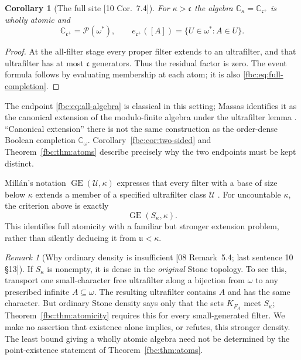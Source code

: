 \documentclass[11pt,letterpaper]{article}
\newtheorem{corollary}[theorem]{Corollary}
\theoremstyle{definition}
\theoremstyle{remark}
\newtheorem{remark}[theorem]{Remark}
\newcommand{\om}{\omega}
\newcommand{\C}{\mathbb C}
\newcommand{\pow}{\mathcal P}
\newcommand{\cu}{\mathfrak u}
\newcommand{\cc}{\mathfrak c}
\newcommand{\GE}{\operatorname{GE}}
\newcommand{\src}[1]{\textup{[#1]}}
\begin{document}
\begin{corollary}[The full site \src{10 Cor.~7.4}]\label{fbc:cor:full-site}
For $\kappa>\cc$ the algebra $\C_\kappa=\C_{\cc^+}$ is wholly atomic and
\begin{equation}\label{fbc:eq:all-algebra}
 \C_{\cc^+}=\pow(\om^*),
 \qquad e_{\cc^+}([A])=\{U\in\om^*:A\in U\}.
\end{equation}
\end{corollary}
\begin{proof}
At the all-filter stage every proper filter extends to an ultrafilter,
and that ultrafilter has at most $\cc$ generators. Thus the residual
factor is zero. The event formula follows by evaluating membership at
each atom; it is also \eqref{fbc:eq:full-completion}.
\end{proof}

The endpoint \eqref{fbc:eq:all-algebra} is classical in this setting;
Massas identifies it as the canonical extension of the modulo-finite
algebra under the ultrafilter lemma \cite[Section~6.1]{Massas}.
``Canonical extension'' there is not the same construction as the
order-dense Boolean completion $\C_\om$.
Corollary~\ref{fbc:cor:two-sided} and Theorem~\ref{fbc:thm:atoms}
describe precisely why the two endpoints must be kept distinct.

Mill\'an's notation $\GE(\mathcal U,\kappa)$ expresses that every
filter with a base of size below $\kappa$ extends a member of a
specified ultrafilter class $\mathcal U$ \cite[Definition~2.1]{Millan}.
For uncountable $\kappa$, the criterion above is exactly
\[
 \GE(S_\kappa,\kappa).
\]
This identifies full atomicity with a familiar but stronger extension
problem, rather than silently deducing it from $\cu<\kappa$.

\begin{remark}[Why ordinary density is insufficient \src{08 Remark~5.4; last sentence 10 \S13}]\label{fbc:rem:density}
If $S_\kappa$ is nonempty, it is dense in the \emph{original} Stone
topology. To see this, transport one small-character free ultrafilter
along a bijection from $\om$ to any prescribed infinite
$A\subseteq\om$. The resulting ultrafilter contains $A$ and has
the same character. But ordinary Stone density says only that the
sets $K_{F_A}$ meet $S_\kappa$; Theorem~\ref{fbc:thm:atomicity} requires
this for every small-generated filter. We make no assertion that
existence alone implies, or refutes, this stronger density. The least
bound giving a wholly atomic algebra need not be determined by the
point-existence statement of Theorem~\ref{fbc:thm:atoms}.
\end{remark}
\end{document}
